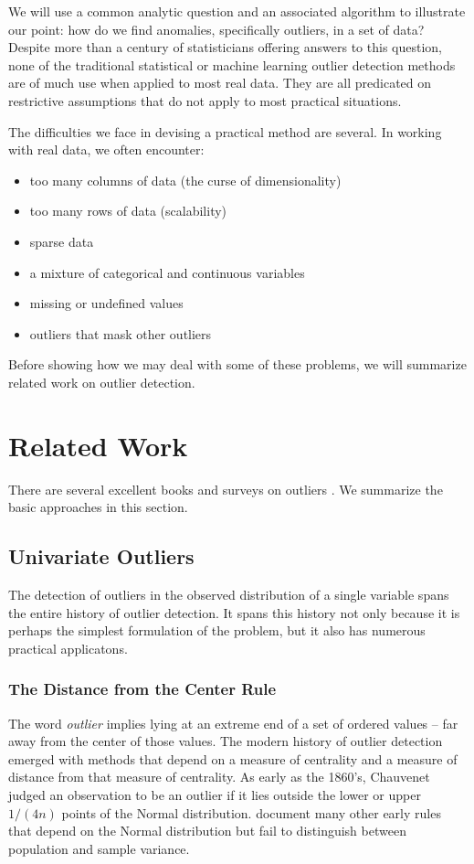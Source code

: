 \documentclass[12pt]{article}
\begin{document}
We will use a common analytic question and an associated algorithm to illustrate our point: how do we find anomalies, specifically outliers, in a set of data? Despite more than a century of statisticians offering answers to this question, none of the traditional statistical or machine learning outlier detection methods are of much use when applied to most real data. They are all predicated on restrictive assumptions that do not apply to most practical situations. 

The difficulties we face in devising a practical method are several. In working with real data, we often encounter:
\begin{itemize}
\setlength\itemsep{0em}
\item too many columns of data (the curse of dimensionality)
\item too many rows of data (scalability)
\item sparse data
\item a mixture of categorical and continuous variables
\item missing or undefined values
\item outliers that mask other outliers
\end{itemize}

Before showing how we may deal with some of these problems, we will summarize related work on outlier detection.

\section{Related Work}
There are several excellent books and surveys on outliers \citep{BarnettLewis,Hawkins,RousseeuwLeroy,thode2002testing,HadiSimonoff,IglewiczHoaglin,AnscombeOutliers,AggarwalOutliers,ChandolaBanerjeeKumar,HodgeOutliers}. We summarize the basic approaches in this section.

\subsection{Univariate Outliers}
The detection of outliers in the observed distribution of a single variable spans the entire history of outlier detection. It spans this history not only because it is perhaps the simplest formulation of the problem, but it also has numerous practical applicatons.

\subsubsection{The Distance from the Center Rule}
The word {\it outlier} implies lying at an extreme end of a set of ordered values -- far away from the center of those values. The modern history of outlier detection emerged with methods that depend on a measure of centrality and a measure of distance from that measure of centrality. As early as the 1860's, Chauvenet \citep{BarnettLewis} judged an observation to be an outlier if it lies outside the lower or upper $1/(4n)$ points of the Normal distribution. \cite{BarnettLewis} document many other early rules that depend on the Normal distribution but fail to distinguish between population and sample variance.
\end{document}

